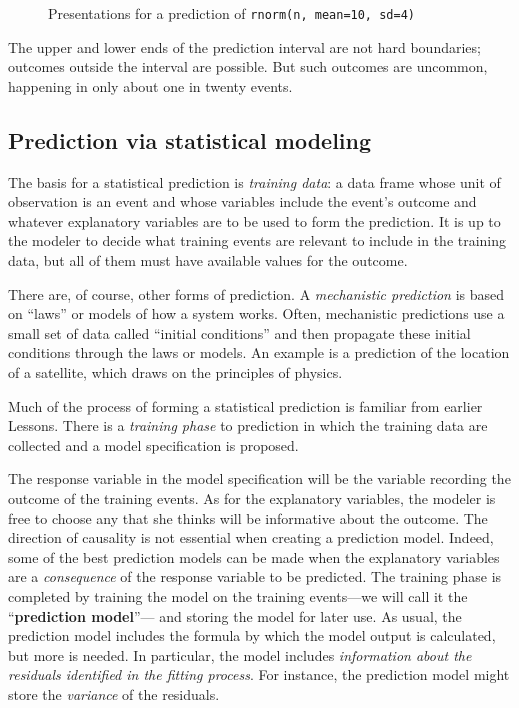 \documentclass[
  letterpaper,
  DIV=11,
  numbers=noendperiod,
  oneside]{scrartcl}
\begin{document}
\begin{tcolorbox}
\begin{figure}[H]
\begin{minipage}{0.33\linewidth}
\end{minipage}%

\caption{\label{fig-norm-equally-likely}Presentations for a prediction
of \texttt{rnorm(n,\ mean=10,\ sd=4)}}

\end{figure}%

The upper and lower ends of the prediction interval are not hard
boundaries; outcomes outside the interval are possible. But such
outcomes are uncommon, happening in only about one in twenty events.

\end{tcolorbox}

\subsection{Prediction via statistical
modeling}\label{prediction-via-statistical-modeling}

The basis for a statistical prediction is \emph{training data}: a data
frame whose unit of observation is an event and whose variables include
the event's outcome and whatever explanatory variables are to be used to
form the prediction. It is up to the modeler to decide what training
events are relevant to include in the training data, but all of them
must have available values for the outcome.

There are, of course, other forms of prediction. A \emph{mechanistic
prediction} is based on ``laws'' or models of how a system works. Often,
mechanistic predictions use a small set of data called ``initial
conditions'' and then propagate these initial conditions through the
laws or models. An example is a prediction of the location of a
satellite, which draws on the principles of physics.

Much of the process of forming a statistical prediction is familiar from
earlier Lessons. There is a \emph{training phase} to prediction in which
the training data are collected and a model specification is proposed.

The response variable in the model specification will be the variable
recording the outcome of the training events. As for the explanatory
variables, the modeler is free to choose any that she thinks will be
informative about the outcome. The direction of causality is not
essential when creating a prediction model. Indeed, some of the best
prediction models can be made when the explanatory variables are a
\emph{consequence} of the response variable to be predicted. The
training phase is completed by training the model on the training
events---we will call it the ``\textbf{prediction model}''--- and
storing the model for later use. As usual, the prediction model includes
the formula by which the model output is calculated, but more is needed.
In particular, the model includes \emph{information about the residuals
identified in the fitting process}. For instance, the prediction model
might store the \emph{variance} of the residuals.
\end{document}
